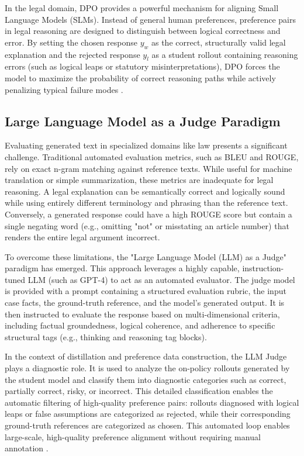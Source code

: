 In the legal domain, DPO provides a powerful mechanism for aligning Small Language Models (SLMs). Instead of general human preferences, preference pairs in legal reasoning are designed to distinguish between logical correctness and error. By setting the chosen response $y_w$ as the correct, structurally valid legal explanation and the rejected response $y_l$ as a student rollout containing reasoning errors (such as logical leaps or statutory misinterpretations), DPO forces the model to maximize the probability of correct reasoning paths while actively penalizing typical failure modes \parencite{li2026legaldrilldiagnosisdrivensynthesislegal}.

\subsection{Large Language Model as a Judge Paradigm}

Evaluating generated text in specialized domains like law presents a significant challenge. Traditional automated evaluation metrics, such as BLEU and ROUGE, rely on exact n-gram matching against reference texts. While useful for machine translation or simple summarization, these metrics are inadequate for legal reasoning. A legal explanation can be semantically correct and logically sound while using entirely different terminology and phrasing than the reference text. Conversely, a generated response could have a high ROUGE score but contain a single negating word (e.g., omitting "not" or misstating an article number) that renders the entire legal argument incorrect.

To overcome these limitations, the "Large Language Model (LLM) as a Judge" paradigm has emerged. This approach leverages a highly capable, instruction-tuned LLM (such as GPT-4) to act as an automated evaluator. The judge model is provided with a prompt containing a structured evaluation rubric, the input case facts, the ground-truth reference, and the model's generated output. It is then instructed to evaluate the response based on multi-dimensional criteria, including factual groundedness, logical coherence, and adherence to specific structural tags (e.g., thinking and reasoning tag blocks).

In the context of distillation and preference data construction, the LLM Judge plays a diagnostic role. It is used to analyze the on-policy rollouts generated by the student model and classify them into diagnostic categories such as correct, partially correct, risky, or incorrect. This detailed classification enables the automatic filtering of high-quality preference pairs: rollouts diagnosed with logical leaps or false assumptions are categorized as rejected, while their corresponding ground-truth references are categorized as chosen. This automated loop enables large-scale, high-quality preference alignment without requiring manual annotation \parencite{li2026legaldrilldiagnosisdrivensynthesislegal}.
